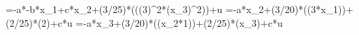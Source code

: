 =-a*-b*x_1+c*x_2+(3/25)*\sin(((3)^2*(x_3)^2))+u
=-a*x_2+(3/20)*\sin((3*x_1))+(2/25)*\cos(2)+c*u
=-a*x_3+(3/20)*\sin((x_2*1))+(2/25)*\cos(x_3)+c*u
